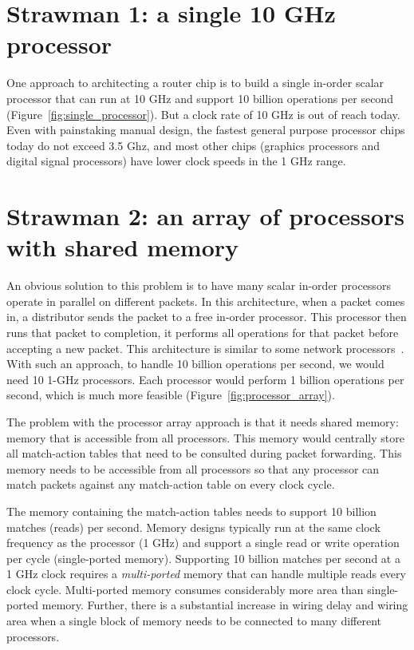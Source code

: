\section{Strawman 1: a single 10 GHz processor}
One approach to architecting a router chip is to build a single in-order scalar
processor that can run at 10 GHz and support 10 billion operations per second
(Figure~\ref{fig:single_processor}). But a clock rate of 10 GHz is out of reach
today. Even with painstaking manual design, the fastest general purpose
processor chips today do not exceed 3.5 Ghz, and most other chips (\eg graphics
processors and digital signal processors) have lower clock speeds in the 1 GHz
range.

\section{Strawman 2: an array of processors with shared memory}
An obvious solution to this problem is to have many scalar in-order processors
operate in parallel on different packets. In this architecture, when a packet
comes in, a distributor sends the packet to a free in-order processor. This
processor then runs that packet to completion, \ie it performs all operations
for that packet before accepting a new packet. This architecture is similar to
some network processors~\cite{ixp1200, ixp2800, quantumflow}.  With such an
approach, to handle 10 billion operations per second, we would need 10 1-GHz
processors. Each processor would perform 1 billion operations per second, which
is much more feasible (Figure~\ref{fig:processor_array}).

The problem with the processor array approach is that it needs shared memory:
 memory that is accessible from all processors. This memory would centrally
store all match-action tables that need to be consulted during packet
forwarding. This memory needs to be accessible from all processors so that any
processor can match packets against any match-action table on every clock
cycle.

The memory containing the match-action tables needs to support 10 billion
matches (reads) per second. Memory designs typically run at the same clock
frequency as the processor (1 GHz) and support a single read or write operation
per cycle (single-ported memory). Supporting 10 billion matches per second at a
1 GHz clock requires a {\em multi-ported} memory that can handle multiple reads
every clock cycle. Multi-ported memory consumes considerably more area than
single-ported memory.  Further, there is a substantial increase in wiring delay
and wiring area when a single block of memory needs to be connected to many
different processors.

